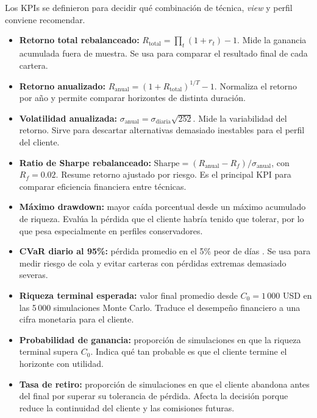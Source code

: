Los KPIs se definieron para decidir qu\'e combinaci\'on de t\'ecnica,
\textit{view} y perfil conviene recomendar. 

\begin{itemize}
    \item \textbf{Retorno total rebalanceado:}
    $R_{\text{total}} = \prod_t (1 + r_t) - 1$. Mide la ganancia acumulada
    fuera de muestra. Se usa para comparar el resultado final de cada cartera.

    \item \textbf{Retorno anualizado:}
    $R_{\text{anual}} = (1 + R_{\text{total}})^{1/T} - 1$. Normaliza el retorno
    por a\~no y permite comparar horizontes de distinta duraci\'on.

    \item \textbf{Volatilidad anualizada:}
    $\sigma_{\text{anual}} = \sigma_{\text{diaria}}\sqrt{252}$. Mide la
    variabilidad del retorno. Sirve para descartar alternativas demasiado
    inestables para el perfil del cliente.

    \item \textbf{Ratio de Sharpe rebalanceado:}
    $\text{Sharpe} = (R_{\text{anual}} - R_f)/\sigma_{\text{anual}}$, con
    $R_f = 0.02$. Resume retorno ajustado por riesgo. Es el principal KPI para
    comparar eficiencia financiera entre t\'ecnicas.

    \item \textbf{M\'aximo drawdown:} mayor ca\'ida porcentual desde un m\'aximo
    acumulado de riqueza. Eval\'ua la p\'erdida que el cliente habr\'ia tenido
    que tolerar, por lo que pesa especialmente en perfiles conservadores.

    \item \textbf{CVaR diario al 95\%:} p\'erdida promedio en el 5\% peor de
    d\'ias \cite{rockafellar2000}. Se usa para medir riesgo de cola y evitar
    carteras con p\'erdidas extremas demasiado severas.

    \item \textbf{Riqueza terminal esperada:} valor final promedio desde
    $C_0 = 1\,000$ USD en las 5\,000 simulaciones Monte Carlo. Traduce el
    desempe\~no financiero a una cifra monetaria para el cliente.

    \item \textbf{Probabilidad de ganancia:} proporci\'on de simulaciones en
    que la riqueza terminal supera $C_0$. Indica qu\'e tan probable es que el
    cliente termine el horizonte con utilidad.

    \item \textbf{Tasa de retiro:} proporci\'on de simulaciones en que el
    cliente abandona antes del final por superar su tolerancia de p\'erdida.
    Afecta la decisi\'on porque reduce la continuidad del cliente y las
    comisiones futuras.


\end{itemize}
